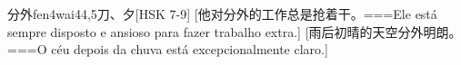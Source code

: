 \begin{EntryWithPhonetic}{分外}{fen4wai4}{4,5}{⼑、⼣}[HSK 7-9]
  [他对分外的工作总是抢着干。===Ele está sempre disposto e ansioso para fazer trabalho extra.]
  [雨后初晴的天空分外明朗。===O céu depois da chuva está excepcionalmente claro.]
\end{EntryWithPhonetic}
